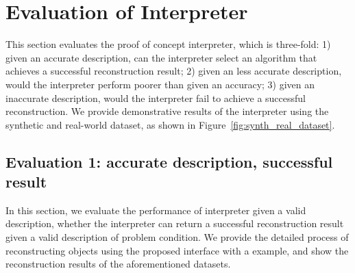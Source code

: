 \section{Evaluation of Interpreter}
\label{sec:eval_interp}
This section evaluates the proof of concept interpreter, which is three-fold: 1) given an accurate description, can the interpreter select an algorithm that achieves a successful reconstruction result; 2) given an less accurate description, would the interpreter perform poorer than given an accuracy; 3) given an inaccurate description, would the interpreter fail to achieve a successful reconstruction. We provide demonstrative results of the interpreter using the synthetic and real-world dataset, as shown in Figure~\ref{fig:synth_real_dataset}.

\subsection{Evaluation 1: accurate description, successful result}
In this section, we evaluate the performance of interpreter given a valid description, \ie whether the interpreter can return a successful reconstruction result given a valid description of problem condition. We provide the detailed process of reconstructing objects using the proposed interface with a example, and show the reconstruction results of the aforementioned datasets.

